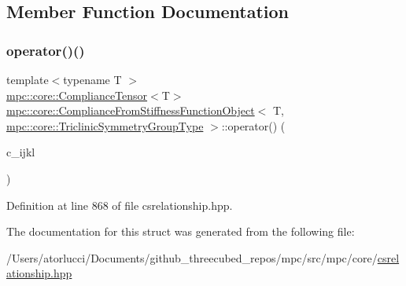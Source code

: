 \subsection{Member Function Documentation}
\mbox{\label{structmpc_1_1core_1_1_compliance_from_stiffness_function_object_3_01_t_00_01mpc_1_1core_1_1_triclinic_symmetry_group_type_01_4_a533db9ba78f6818a61eeb5da0868e256}} 
\subsubsection{\texorpdfstring{operator()()}{operator()()}}
{\footnotesize\ttfamily template$<$typename T $>$ \\
\mbox{\hyperlink{structmpc_1_1core_1_1_compliance_tensor}{mpc\+::core\+::\+Compliance\+Tensor}}$<$T$>$ \mbox{\hyperlink{structmpc_1_1core_1_1_compliance_from_stiffness_function_object}{mpc\+::core\+::\+Compliance\+From\+Stiffness\+Function\+Object}}$<$ T, \mbox{\hyperlink{structmpc_1_1core_1_1_triclinic_symmetry_group_type}{mpc\+::core\+::\+Triclinic\+Symmetry\+Group\+Type}} $>$\+::operator() (\begin{DoxyParamCaption}\item[{const \mbox{\hyperlink{structmpc_1_1core_1_1_stiffness_tensor}{mpc\+::core\+::\+Stiffness\+Tensor}}$<$ T $>$ \&}]{c\+\_\+ijkl }\end{DoxyParamCaption})\hspace{0.3cm}{\ttfamily [inline]}}



Definition at line 868 of file csrelationship.\+hpp.



The documentation for this struct was generated from the following file\+:\begin{DoxyCompactItemize}
\item 
/\+Users/atorlucci/\+Documents/github\+\_\+threecubed\+\_\+repos/mpc/src/mpc/core/\mbox{\hyperlink{csrelationship_8hpp}{csrelationship.\+hpp}}\end{DoxyCompactItemize}
